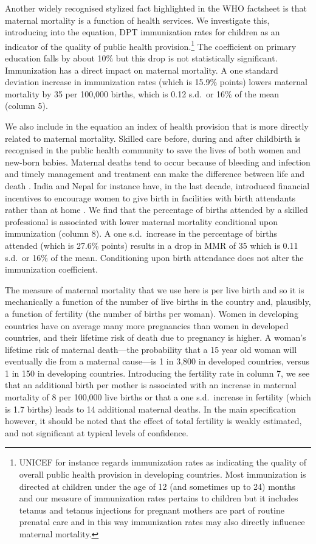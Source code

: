 \documentclass{article}[12pt,subeqn]
\begin{document}
\begin{spacing}{1.4}
Another widely recognised stylized fact highlighted in the WHO factsheet is that 
maternal mortality is a function of health services. We investigate this, 
introducing into the equation, DPT immunization rates for children as an indicator 
of the quality of public health provision.\footnote{UNICEF for instance regards 
immunization rates as indicating the quality of overall public health provision 
in developing countries. Most immunization is directed at children under the age 
of 12 (and sometimes up to 24) months and our measure of immunization rates 
pertains to children but it includes tetanus and tetanus injections for pregnant 
mothers are part of routine prenatal care and in this way immunization rates may
also directly influence maternal mortality.} The coefficient on primary 
education falls by about 10\% but this drop is not statistically 
significant. Immunization has a direct impact on maternal mortality. A one 
standard deviation increase in immunization rates (which is 15.9\% points) lowers 
maternal mortality by 35 per 100,000 births, which is 0.12 s.d.\ or 16\% of the 
mean (column 5).

We also include in the equation an index of health provision that is more 
directly related to maternal mortality. Skilled care before, during and after 
childbirth is recognised in the public health community to save the lives of both 
women and new-born babies. Maternal deaths tend to occur because of bleeding and
infection and timely management and treatment can make the difference between life 
and death \citep{WHO2012}. India and Nepal for instance have, in the last decade, 
introduced financial incentives to encourage women to give birth in facilities 
with birth attendants rather than at home \citep{Milleretal2012,
PowellJacksonHanson2012}. We find that the percentage of births attended by a 
skilled professional is associated with lower maternal mortality conditional upon 
immunization (column 8). A one s.d.\ increase in the percentage of births attended 
(which is 27.6\% points) results in a drop in MMR of 35 which is 0.11 s.d.\ or 16\% 
of the mean. Conditioning upon birth attendance does not alter the immunization 
coefficient.

The measure of maternal mortality that we use here is per live birth and so it is 
mechanically a function of the number of live births in the country and, plausibly, 
a function of fertility (the number of births per woman). Women in developing 
countries have on average many more pregnancies than women in developed countries, 
and their lifetime risk of death due to pregnancy is higher. A woman's lifetime 
risk of maternal death---the probability that a 15 year old woman will eventually 
die from a maternal cause---is 1 in 3,800 in developed countries, versus 1 in 150 
in developing countries. Introducing the fertility rate in column 7, we see that an 
additional birth per mother is associated with an increase in maternal mortality of
8 per 100,000 live births or that a one s.d.\ increase in fertility (which is 1.7
births) leads to 14 additional maternal deaths. In the main specification however,
it should be noted that the effect of total fertility is weakly estimated, and not
significant at typical levels of confidence.


\end{spacing}
\end{document}
